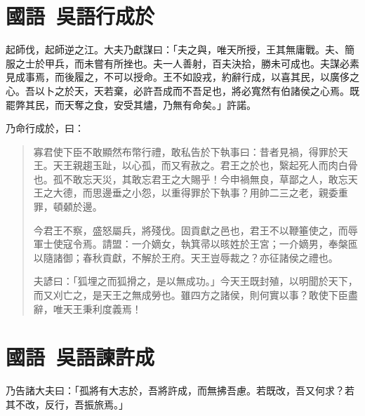 \section[諸稽郢行成於吳\quad{\small 國語 吳語}]{{\normalsize 國語\ 吳語}\quad {}行成於}
起師伐，起師逆之江。大夫乃獻謀曰：「夫之與，唯天所授，王其無庸戰。夫、簡服之士於甲兵，而未嘗有所挫也。夫一人善射，百夫決拾，勝未可成也。夫謀必素見成事焉，而後履之，不可以授命。王不如設戎，約辭行成，以喜其民，以廣侈之心。吾以卜之於天，天若棄，必許吾成而不吾足也，將必寬然有伯諸侯之心焉。既罷弊其民，而天奪之食，安受其燼，乃無有命矣。」許諾。

乃命行成於，曰：

\begin{quotation}
寡君使下臣不敢顯然布幣行禮，敢私告於下執事曰：昔者見禍，得罪於天王。天王親趨玉趾，以心孤，而又宥赦之。君王之於也，繄起死人而肉白骨也。孤不敢忘天災，其敢忘君王之大賜乎！今申禍無良，草鄙之人，敢忘天王之大德，而思邊垂之小怨，以重得罪於下執事？用帥二三之老，親委重罪，頓顙於邊。

今君王不察，盛怒屬兵，將殘伐。固貢獻之邑也，君王不以鞭箠使之，而辱軍士使寇令焉。請盟：一介嫡女，執箕帚以晐姓於王宮；一介嫡男，奉槃匜以隨諸御；春秋貢獻，不解於王府。天王豈辱裁之？亦征諸侯之禮也。

夫諺曰：「狐埋之而狐搰之，是以無成功。」今天王既封殖，以明聞於天下，而又刈亡之，是天王之無成勞也。雖四方之諸侯，則何實以事？敢使下臣盡辭，唯天王秉利度義焉！
\end{quotation}
\vspace{-1em}
\theendnotes

\section[申胥諫許越成\quad{\small 國語 吳語}]{{\normalsize 國語\ 吳語}\quad {}諫許成}
乃告諸大夫曰：「孤將有大志於，吾將許成，而無拂吾慮。若既改，吾又何求？若其不改，反行，吾振旅焉。」

